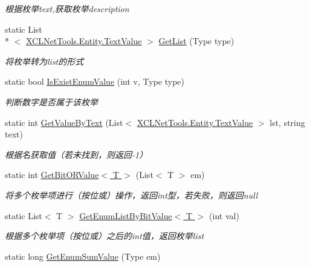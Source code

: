 \begin{DoxyCompactItemize}
\begin{DoxyCompactList}\small\item\em 根据枚举text,获取枚举description \end{DoxyCompactList}\item 
static List\\*
$<$ \hyperlink{class_x_c_l_net_tools_1_1_entity_1_1_text_value}{X\-C\-L\-Net\-Tools.\-Entity.\-Text\-Value} $>$ \hyperlink{class_x_c_l_net_tools_1_1_enum_1_1_enum_helper_a0f98e6348aacd00a6254794e6565c173}{Get\-List} (Type type)
\begin{DoxyCompactList}\small\item\em 将枚举转为list的形式 \end{DoxyCompactList}\item 
static bool \hyperlink{class_x_c_l_net_tools_1_1_enum_1_1_enum_helper_a364b52512aee90c0f2530745f4127047}{Is\-Exist\-Enum\-Value} (int v, Type type)
\begin{DoxyCompactList}\small\item\em 判断数字是否属于该枚举 \end{DoxyCompactList}\item 
static int \hyperlink{class_x_c_l_net_tools_1_1_enum_1_1_enum_helper_ab5d340064717d8cf3c9c6036d3770b1f}{Get\-Value\-By\-Text} (List$<$ \hyperlink{class_x_c_l_net_tools_1_1_entity_1_1_text_value}{X\-C\-L\-Net\-Tools.\-Entity.\-Text\-Value} $>$ lst, string text)
\begin{DoxyCompactList}\small\item\em 根据名获取值（若未找到，则返回-\/1） \end{DoxyCompactList}\item 
static int \hyperlink{class_x_c_l_net_tools_1_1_enum_1_1_enum_helper_a8ee641787655d2b4f06cb51486ea8be3}{Get\-Bit\-O\-R\-Value$<$ T $>$} (List$<$ T $>$ em)
\begin{DoxyCompactList}\small\item\em 将多个枚举项进行（按位或）操作，返回int型，若失败，则返回null \end{DoxyCompactList}\item 
static List$<$ T $>$ \hyperlink{class_x_c_l_net_tools_1_1_enum_1_1_enum_helper_a7023c3a9e2c46de0cdeed71bce2cfb6a}{Get\-Enum\-List\-By\-Bit\-Value$<$ T $>$} (int val)
\begin{DoxyCompactList}\small\item\em 根据多个枚举项（按位或）之后的int值，返回枚举list \end{DoxyCompactList}\item 
static long \hyperlink{class_x_c_l_net_tools_1_1_enum_1_1_enum_helper_a43bf704153939cd6950d5d88e072c691}{Get\-Enum\-Sum\-Value} (Type em)

\end{DoxyCompactItemize}
